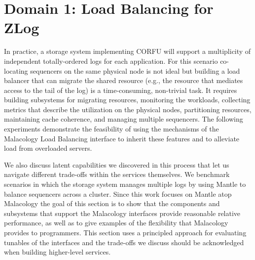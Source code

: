 \section{Domain 1: Load Balancing for ZLog}
\label{sec:zlog}

In practice, a storage system implementing CORFU will support a multiplicity of
independent totally-ordered logs for each application.  For this scenario
co-locating sequencers on the same physical node is not ideal but building a
load balancer that can migrate the shared resource (e.g., the resource
that mediates access to the tail of the log) is a time-consuming, non-trivial
task.  It requires building subsystems for migrating resources, monitoring the
workloads, collecting metrics that describe the utilization on the physical
nodes, partitioning resources, maintaining cache coherence, and managing
multiple sequencers. The following experiments demonstrate the feasibility of
using the mechanisms of the Malacology Load Balancing interface to inherit
these features and to alleviate load from overloaded servers.

We also discuss latent capabilities we discovered in this process that let us
navigate different trade-offs within the services themselves.  We benchmark
scenarios in which the storage system manages multiple logs by using Mantle to
balance sequencers across a cluster.  Since this work focuses on Mantle atop
Malacology the goal of this section is to show that the components and
subsystems that support the Malacology interfaces provide reasonable relative
performance, as well as to give examples of the flexibility that Malacology
provides to programmers.  This section uses a principled approach for
evaluating tunables of the interfaces and the trade-offs we discuss should be
acknowledged when building higher-level services.


